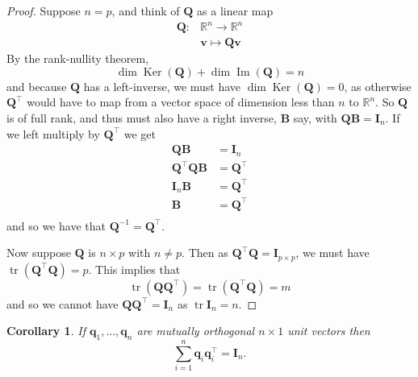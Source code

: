 \documentclass[
]{book}
\newtheorem{corollary}{Corollary}[chapter]
\theoremstyle{definition}
\theoremstyle{definition}
\theoremstyle{definition}
\theoremstyle{definition}
\theoremstyle{remark}
\begin{document}
\begin{proof}
Suppose \(n=p\), and think of \(\mathbf Q\) as a linear map
\begin{align*}
\mathbf Q: &\mathbb{R}^n \rightarrow \mathbb{R}^n\\
&\mathbf v\mapsto \mathbf Q\mathbf v
\end{align*}
By the rank-nullity theorem,
\[\dim \operatorname{Ker}(\mathbf Q) + \dim \operatorname{Im}(\mathbf Q) =n\]
and because \(\mathbf Q\) has a left-inverse, we must have \(\dim \operatorname{Ker}(\mathbf Q)=0\), as otherwise \(\mathbf Q^\top\) would have to map from a vector space of dimension less than \(n\) to \(\mathbb{R}^n\). So \(\mathbf Q\) is of full rank, and thus must also have a right inverse, \(\mathbf B\) say, with \(\mathbf Q\mathbf B=\mathbf I_n\). If we left multiply by \(\mathbf Q^\top\) we get
\begin{align*}
\mathbf Q\mathbf B&=\mathbf I_n\\
\mathbf Q^\top\mathbf Q\mathbf B&=\mathbf Q^\top\\
\mathbf I_n \mathbf B&= \mathbf Q^\top\\
\mathbf B&= \mathbf Q^\top\\
\end{align*}
and so we have that \(\mathbf Q^{-1}=\mathbf Q^\top\).

Now suppose \(\mathbf Q\) is \(n \times p\) with \(n\not = p\). Then as
\(\mathbf Q^\top \mathbf Q=\mathbf I_{p\times p}\), we must have \(\operatorname{tr}(\mathbf Q^\top \mathbf Q)=p\). This implies that
\[\operatorname{tr}(\mathbf Q\mathbf Q^\top)=\operatorname{tr}(\mathbf Q^\top \mathbf Q)=m\] and so
we cannot have \(\mathbf Q\mathbf Q^\top=\mathbf I_{n}\) as \(\operatorname{tr}{\mathbf I_{n}}=n\).
\end{proof}

\begin{corollary}
\protect\hypertarget{cor:two1}{}{\label{cor:two1} }If \(\mathbf q_1, \ldots , \mathbf q_n\) are mutually orthogonal \(n \times 1\) unit vectors then
\[
\sum_{i=1}^n \mathbf q_i \mathbf q_i^\top = {\mathbf I}_n.
\]
\end{corollary}
\end{document}
